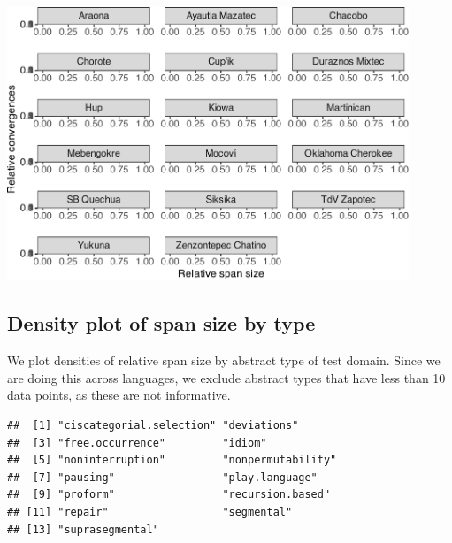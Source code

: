 \documentclass[
]{article}
\newenvironment{Shaded}{\begin{snugshade}}{\end{snugshade}}
\newcommand{\CommentTok}[1]{\textcolor[rgb]{0.56,0.35,0.01}{\textit{#1}}}
\newcommand{\FunctionTok}[1]{\textcolor[rgb]{0.13,0.29,0.53}{\textbf{#1}}}
\newcommand{\NormalTok}[1]{#1}
\newcommand{\SpecialCharTok}[1]{\textcolor[rgb]{0.81,0.36,0.00}{\textbf{#1}}}
\begin{document}
\begin{center}\includegraphics[width=0.9\textwidth,height=\textheight]{02_analyses_chapter17_files/figure-latex/dot plot-1} \end{center}

\subsection{Density plot of span size by
type}\label{density-plot-of-span-size-by-type}

We plot densities of relative span size by abstract type of test domain.
Since we are doing this across languages, we exclude abstract types that
have less than 10 data points, as these are not informative.

\begin{Shaded}
\end{Shaded}

\begin{verbatim}
##  [1] "ciscategorial.selection" "deviations"             
##  [3] "free.occurrence"         "idiom"                  
##  [5] "noninterruption"         "nonpermutability"       
##  [7] "pausing"                 "play.language"          
##  [9] "proform"                 "recursion.based"        
## [11] "repair"                  "segmental"              
## [13] "suprasegmental"
\end{verbatim}
\end{document}
